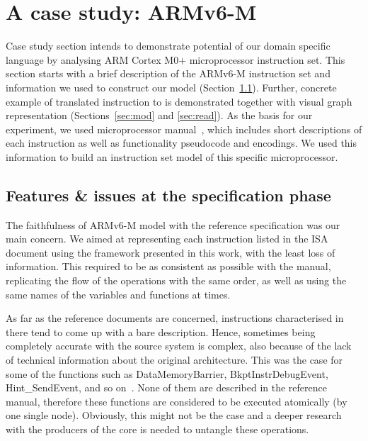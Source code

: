 \documentclass[conference]{IEEEtran}
\begin{document}

\section{A case study: ARMv6-M}
\label{sec:arm}
Case study section intends to demonstrate potential of our domain specific language by
analysing ARM Cortex M0+ microprocessor instruction set. This section starts with a brief
description of the ARMv6-M instruction set and information we used to construct our model
(Section~\ref{sec:feat}). Further, concrete example of translated instruction to is
demonstrated together with visual graph representation (Sections~\ref{sec:mod} and
\ref{sec:read}). As the basis for our experiment, we used microprocessor
manual~\cite{armManual}, which includes short descriptions of each instruction as well as
functionality pseudocode and encodings. We used this information to build an instruction set
model of this specific microprocessor. 

\subsection{Features \& issues at the specification phase}
\label{sec:feat}
The faithfulness of ARMv6-M model with the reference specification was our main concern.
We aimed at representing each instruction listed in the ISA document using the
framework presented in this work, with the least loss of information. This required to be
as consistent as possible with the manual, replicating the flow of the operations with
the same order, as well as using the same names of the variables and functions at times.

As far as the reference documents are concerned, instructions characterised in there tend to
come up with a bare description. Hence, sometimes being completely accurate with 
the source system is complex, also because of the lack of technical information about the
original architecture. This was the case for some of the functions such as DataMemoryBarrier,
BkptInstrDebugEvent, Hint\_SendEvent, and so on~\cite{armManual}.
None of them are described in the reference manual, therefore these
functions are considered to be executed atomically (by one single node). Obviously, this
might not be the case and a deeper research with the producers of the core is needed to
untangle these operations.
\end{document}
